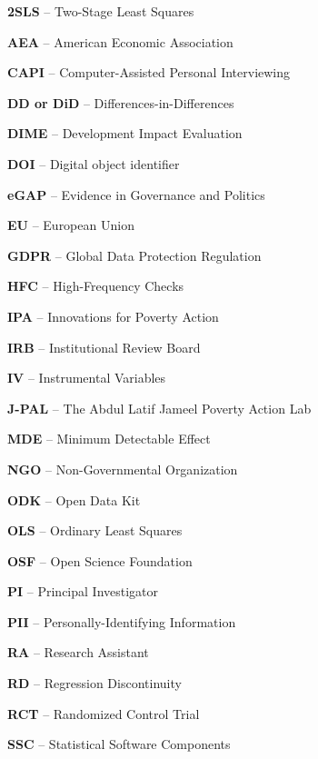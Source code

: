 \noindent\textbf{2SLS} -- Two-Stage Least Squares

\noindent\textbf{AEA} -- American Economic Association

\noindent\textbf{CAPI} -- Computer-Assisted Personal Interviewing

\noindent\textbf{DD or DiD} -- Differences-in-Differences

\noindent\textbf{DIME} -- Development Impact Evaluation

\noindent\textbf{DOI} -- Digital object identifier

\noindent\textbf{eGAP} -- Evidence in Governance and Politics

\noindent\textbf{EU} -- European Union

\noindent\textbf{GDPR} -- Global Data Protection Regulation

\noindent\textbf{HFC} -- High-Frequency Checks

\noindent\textbf{IPA} -- Innovations for Poverty Action

\noindent\textbf{IRB} -- Institutional Review Board

\noindent\textbf{IV} -- Instrumental Variables

\noindent\textbf{J-PAL} -- The Abdul Latif Jameel Poverty Action Lab

\noindent\textbf{MDE} -- Minimum Detectable Effect

\noindent\textbf{NGO} -- Non-Governmental Organization

\noindent\textbf{ODK} -- Open Data Kit

\noindent\textbf{OLS} -- Ordinary Least Squares

\noindent\textbf{OSF} -- Open Science Foundation

\noindent\textbf{PI} -- Principal Investigator

\noindent\textbf{PII} -- Personally-Identifying Information

\noindent\textbf{RA} -- Research Assistant

\noindent\textbf{RD} -- Regression Discontinuity

\noindent\textbf{RCT} -- Randomized Control Trial

\noindent\textbf{SSC} -- Statistical Software Components
